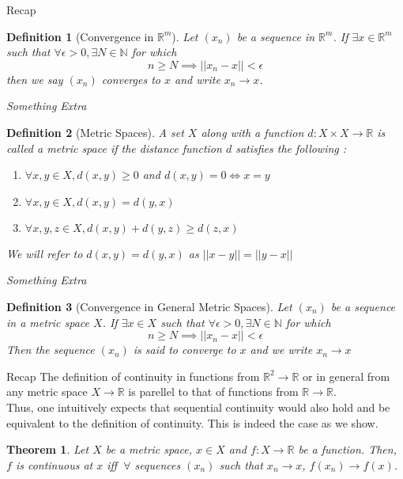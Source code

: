 \documentclass[aspectratio=169]{beamer}
\newtheorem{thm}{Theorem}
\newtheorem{df}{Definition}
\newcommand{\bN}{\mathbb{N}}
\newcommand{\bR}{\mathbb{R}}
\newcommand{\normtwo}[1]{||#1||}
\begin{document}
\begin{frame}{Recap}
 {
\begin{df}[Convergence in $\bR^m$]
Let $(x_n)$ be a sequence in $\bR^m$. If $\exists x \in \bR^m$ such that $\forall \epsilon>0, \exists N \in \bN$ for which
$$n\geq N \implies \normtwo{x_n-x}<\epsilon$$
then we say $(x_n)$ converges to $x$ and write $x_n \to x$.
\end{df}
}
\end{frame}

\begin{frame}{\textit{Something Extra}}
 {
\begin{df}[Metric Spaces]
A set $X$ along with a function $d:X\times X \to \bR$ is called a metric space if the distance function $d$ satisfies the following :
\begin{enumerate}
\item $\forall x,y\in X, d(x,y)\geq 0$ and $d(x,y)=0 \Leftrightarrow x=y$
\item $\forall x,y\in X, d(x,y) = d(y,x)$
\item $\forall x,y,z\in X, d(x,y) + d(y,z) \geq d(z,x)$
\end{enumerate}
We will refer to $d(x,y) = d(y,x)$ as $\normtwo{x-y} = \normtwo{y-x}$
\end{df}
}
\end{frame}

\begin{frame}{\textit{Something Extra}}
 {
\begin{df}[Convergence in General Metric Spaces]
Let $(x_n)$ be a sequence in a metric space $X$. If $\exists x \in X$ such that $\forall \epsilon>0, \exists N \in \bN$ for which $$n\geq N \implies \normtwo{x_n-x}<\epsilon$$
Then the sequence $(x_n)$ is said to converge to $x$ and we write $x_n \to x$\\
\end{df}
}
\end{frame}

\begin{frame}{Recap}
 {
	The definition of continuity in functions from $\bR^2\to\bR$ or in general from any metric space $X\to\bR$ is parellel to that of functions from $\bR\to\bR$.\\
}
 {
    Thus, one intuitively expects that sequential continuity would also hold and be equivalent to the definition of continuity. This is indeed the case as we show.
}
 {
    \begin{thm}
    Let $X$ be a metric space, $x\in X$ and $f:X\to\bR$ be a function. Then, $f$ is continuous at $x$ iff $~\forall$ sequences $(x_n)$ such that $x_n \to x$, $f(x_n) \to f(x)$.
    \end{thm}
}
\end{frame}
\end{document}
